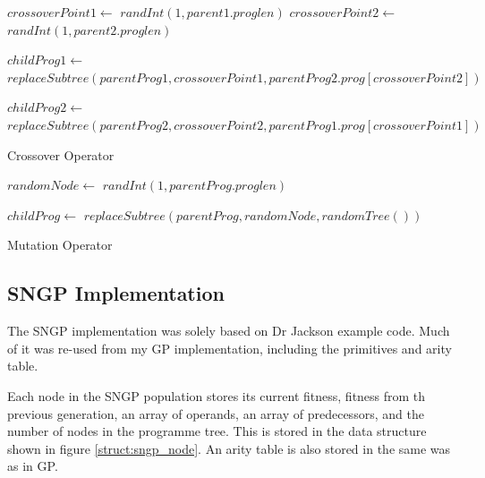 \documentclass{article}
\newcommand{\assign}[2]{$#1 \leftarrow$ #2}
\begin{document}
    	\begin{algorithm}[H]
    		
    		
    		\assign{crossoverPoint1}{$randInt(1,parent1.proglen)$}
    		\assign{crossoverPoint2}{$randInt(1,parent2.proglen)$}
    		
    		\assign{childProg1}{$replaceSubtree( parentProg1, crossoverPoint1, parentProg2.prog[crossoverPoint2] )$}
    		
    		\assign{childProg2}{$replaceSubtree( parentProg2, crossoverPoint2, parentProg1.prog[crossoverPoint1] )$}
    		
    		
    		\caption{Crossover Operator}
    		
    		\label{alg:crossover}
    		
    	\end{algorithm}
    
    	\begin{algorithm}[H]
    		
    		\KwIn{parentProg}
    		
    		\assign{randomNode}{$randInt(1,parentProg.proglen)$}
    		
    		\assign{childProg}{$replaceSubtree( parentProg, randomNode, randomTree() )$}
    		
    		\KwOut{childProg}
    		
    		\caption{Mutation Operator}
    		
    		\label{alg:mutation}
    		
    	\end{algorithm}
    
    	

	\subsection{SNGP Implementation}
        
        The SNGP implementation was solely based on Dr Jackson example code. Much of it was re-used from my GP implementation, including the primitives and arity table.
        
        Each node in the SNGP population stores its current fitness, fitness from th previous generation, an array of operands, an array of predecessors, and the number of nodes in the programme tree. This is stored in the data structure shown in figure \ref{struct:sngp_node}. An arity table is also stored in the same was as in GP.
        
\end{document}

